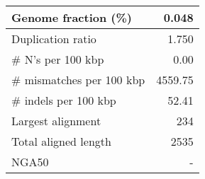 \documentclass[12pt,a4paper]{article}
\begin{document}
\begin{table}[ht]
\begin{center}
\begin{tabular}{|l*{1}{|r}|}
Genome fraction (\%) & 0.048 \\ \hline
Duplication ratio & 1.750 \\ \hline
\# N's per 100 kbp & 0.00 \\ \hline
\# mismatches per 100 kbp & 4559.75 \\ \hline
\# indels per 100 kbp & 52.41 \\ \hline
Largest alignment & 234 \\ \hline
Total aligned length & 2535 \\ \hline
NGA50 & - \\ \hline
\end{tabular}
\end{center}
\end{table}
\end{document}
